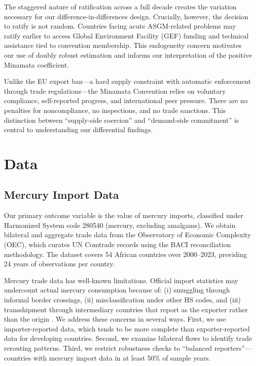 \documentclass[12pt]{article}
\begin{document}
The staggered nature of ratification across a full decade creates the variation necessary for our difference-in-differences design. Crucially, however, the decision to ratify is not random. Countries facing acute ASGM-related problems may ratify earlier to access Global Environment Facility (GEF) funding and technical assistance tied to convention membership. This endogeneity concern motivates our use of doubly robust estimation and informs our interpretation of the positive Minamata coefficient.

Unlike the EU export ban---a hard supply constraint with automatic enforcement through trade regulations---the Minamata Convention relies on voluntary compliance, self-reported progress, and international peer pressure. There are no penalties for noncompliance, no inspections, and no trade sanctions. This distinction between ``supply-side coercion'' and ``demand-side commitment'' is central to understanding our differential findings.


\section{Data}

\subsection{Mercury Import Data}

Our primary outcome variable is the value of mercury imports, classified under Harmonized System code 280540 (mercury, excluding amalgams). We obtain bilateral and aggregate trade data from the Observatory of Economic Complexity (OEC), which curates UN Comtrade records using the BACI reconciliation methodology. The dataset covers 54 African countries over 2000--2023, providing 24 years of observations per country.

Mercury trade data has well-known limitations. Official import statistics may undercount actual mercury consumption because of: (i) smuggling through informal border crossings, (ii) misclassification under other HS codes, and (iii) transshipment through intermediary countries that report as the exporter rather than the origin \citep{fritz2022smuggling}. We address these concerns in several ways. First, we use importer-reported data, which tends to be more complete than exporter-reported data for developing countries. Second, we examine bilateral flows to identify trade rerouting patterns. Third, we restrict robustness checks to ``balanced reporters''---countries with mercury import data in at least 50\% of sample years.
\end{document}
